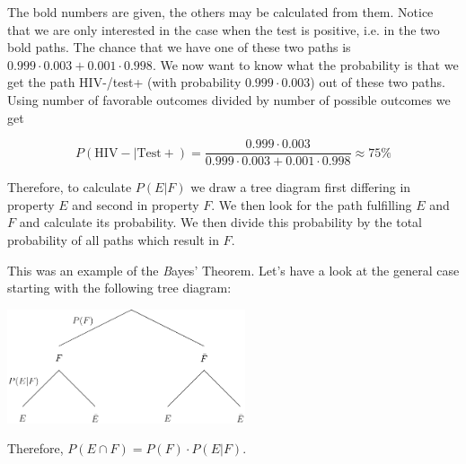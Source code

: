 \documentclass[twoside,11pt,a4paper]{article}
\newif\ifEN \ENtrue	                %
\def\tr|#1|#2|{\ifEN #2\else #1\fi}     %
\def\trr;#1;#2;{\ifEN #2\else #1\fi}     %
\newenvironment{tile}{\begin{tcolorbox}[colback=tile,sharp corners]}{\end{tcolorbox}}
\def\vsp{\vspace{5mm}}
\theoremstyle{definition}
\begin{document}
\tr|Die fettgedruckten Zahlen sind gegeben, die anderen können aus ihnen berechnet werden. 
Wir sind nur an den Fällen interessiert, in denen der Test positiv war, d.h. an den beiden fettgedruckten Pfaden. 
Die Wahrscheinlichkei für diese beiden Pfade ist $0.999\cdot 0.003 + 0.001\cdot 0.998$. Nun möchten wir wissen, wie wahrscheinlich der Pfad HIV-/Test+ (der die Wahrscheinlichkeit $0.999\cdot 0.003$ hat) 
in Bezug auf diese beiden Pfade ist.
|The bold numbers are given, the others may be calculated from them. Notice that we are only interested in the case when the test is positive, i.e. in the two bold paths. 
The chance that we have one of these two paths is $0.999\cdot 0.003 + 0.001\cdot 0.998$. 
We now want to know what the probability is that we get the path HIV-/test+ (with probability $0.999\cdot 0.003$) out of these two paths. 
Using number of favorable outcomes divided by number of possible outcomes we get|

\[
  P(\text{HIV}- | \text{Test}+)=\frac{0.999\cdot 0.003}{0.999\cdot 0.003 + 0.001\cdot 0.998}\approx 75\%
\]
\vsp

\begin{tile}
  \trr;Um die bedingt Wahrscheinlichkeit $P(E|F)$ zu berechnen zeichnet man ein Baumdiagramm, das sich zuerst bezüglich 
  $E$ aufspaltet und dann bezüglich $F$. Dann berechnet man die Wahrscheinlichkeit des Pfades der $E$ und $F$ erfüllt. 
  Diese Wahrscheinlichkeit teilt man durch die Wahrscheinlichkeit aller Pfade, die in $F$ enden. 
  ;Therefore, to calculate $P(E|F)$ we draw a tree diagram first differing in property $E$ and second in property $F$. 
  We then look for the path fulfilling $E$ and $F$ and calculate its probability. 
  We then divide this probability by the total probability of all paths which result in $F$. ;
\end{tile}



\tr|Die Verallgemeinerung des obigen Beislpiels führt auf den \emph{Satz von Bayes}. Schauen wir uns also den allgemeinen Fall an:
|This was an example of the \emph{Bayes' Theorem}. Let's have a look at the general case starting with the following tree diagram:|

\begin{center}
  \includegraphics[width=7cm]{tree_Bayes_1}
\end{center}
\trr;Und es gilt; Therefore,; $P(E\cap F) = P(F) \cdot P(E|F)$.
\vsp
\end{document}
